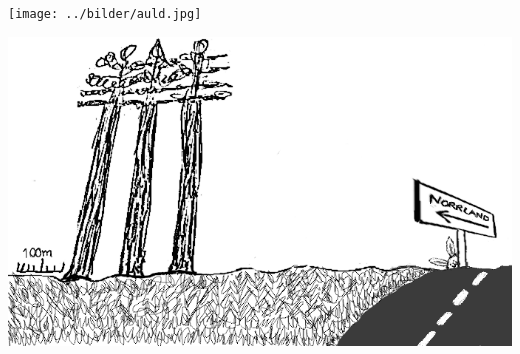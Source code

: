 %

\begin{intersong}
\sffamily\bfseries\LARGE{}
\begin{center}
	\vspace{10mm}
\texttt{[image: ../bilder/auld.jpg]} 
\end{center}
\end{intersong}
\sclearpage

\sclearpage



\begin{intersong}
	\begin{center}
		\vspace{30mm}
		\includegraphics[width=1\textwidth]{../bilder/fardigabilder/CamillasFardigaBilder/Norrlandsdjupaskogar2.png} 
	\end{center}
\end{intersong}
\sclearpage



\sclearpage


\sclearpage

\sclearpage


